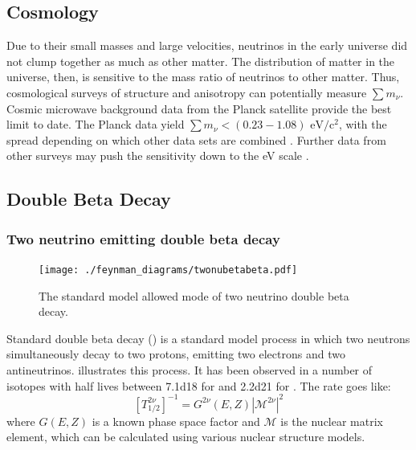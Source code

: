 \documentclass[herrin-thesis.tex]{subfiles}
\begin{document}
\subsection{Cosmology}
Due to their small masses and large velocities, neutrinos in the early universe did not clump together as much as other matter. The distribution of matter in the universe, then, is sensitive to the mass ratio of neutrinos to other matter. Thus, cosmological surveys of structure and anisotropy can potentially measure \(\sum m_{\nu}\). Cosmic microwave background data from the Planck satellite provide the best limit to date. The Planck data yield \(\sum m_{\nu} < (0.23 - 1.08) \text{ eV}/\text{c}^2\), with the spread depending on which other data sets are combined \cite{Ade:2013kl}. Further data from other surveys may push the sensitivity down to the \si{\eV} scale \cite{Abazajian:2011dt}.

\subsection{Double Beta Decay}
\label{sec:nu_doublebetadecay}

\subsubsection{Two neutrino emitting double beta decay}

\begin{figure}[htp]
	\centering
	\texttt{[image: ./feynman\_diagrams/twonubetabeta.pdf]}
	\caption[Diagram of \(2\nu\beta\beta\)]{The standard model allowed mode of two neutrino double beta decay.}
	\label{fig:nu_diagram_2nubb}
\end{figure}

Standard double beta decay (\twonu{}) is a standard model process in which two neutrons simultaneously decay to two protons, emitting two electrons and two antineutrinos.  illustrates this process. It has been observed in a number of isotopes with half lives between \SI{7.1d18}{\year} for  \cite{Arnold:2005hc} and \SI{2.2d21}{\year} for  \cite{Auger:2012ar}. The rate goes like:
\begin{equation}
\left [ T^{2\nu}_{1/2} \right ]^{-1} = G^{2\nu}\left(E, Z\right)\left| \mathcal{M}^{2\nu}\right |^2
\label{eq:nu_twonu_rate}
\end{equation}
where \(G(E,Z)\) is a known phase space factor and \(\mathcal{M}\) is the nuclear matrix element, which can be calculated using various nuclear structure models.
\end{document}
